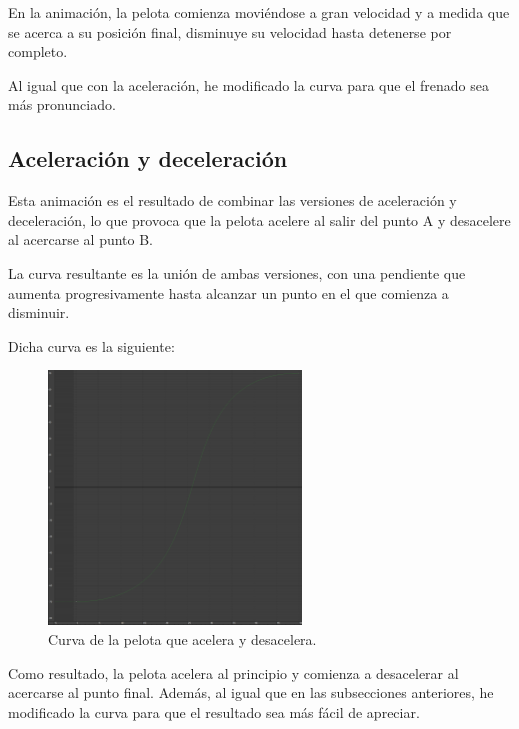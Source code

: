 \documentclass{article}
\begin{document}
En la animación, la pelota comienza moviéndose a gran velocidad y a medida que se acerca a su posición final, disminuye su velocidad hasta detenerse por completo.

\bigskip

Al igual que con la aceleración, he modificado la curva para que el frenado sea más pronunciado.

\newpage

\subsection{Aceleración y deceleración}

Esta animación es el resultado de combinar las versiones de aceleración y deceleración, lo que provoca que la pelota acelere al salir del punto A y desacelere al acercarse al punto B.

\bigskip

La curva resultante es la unión de ambas versiones, con una pendiente que aumenta progresivamente hasta alcanzar un punto en el que comienza a disminuir.

Dicha curva es la siguiente:

\begin{figure}[H]
    \centering
    \includegraphics[width=0.6\textwidth]{imagenes/Ejercicio 1/curvas/aceldecel.png}
    \caption{Curva de la pelota que acelera y desacelera.}
\end{figure}

\bigskip

Como resultado, la pelota acelera al principio y comienza a desacelerar al acercarse al punto final. Además, al igual que en las subsecciones anteriores, he modificado la curva para que el resultado sea más fácil de apreciar.
\end{document}
